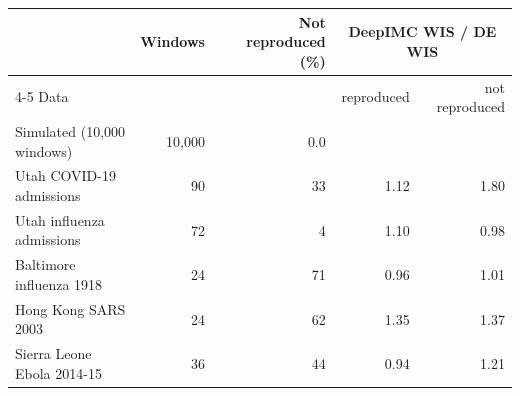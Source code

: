 \begin{tabular}{lrrrr}
\toprule
 & Windows & Not reproduced (\%) & \multicolumn{2}{c}{DeepIMC WIS / DE WIS} \\
\cmidrule(lr){4-5}
Data &  &  & reproduced & not reproduced \\
\midrule
Simulated (10,000 windows) & 10,000 & 0.0 &  &  \\
Utah COVID-19 admissions & 90 & 33 & 1.12 & 1.80 \\
Utah influenza admissions & 72 & 4 & 1.10 & 0.98 \\
Baltimore influenza 1918 & 24 & 71 & 0.96 & 1.01 \\
Hong Kong SARS 2003 & 24 & 62 & 1.35 & 1.37 \\
Sierra Leone Ebola 2014-15 & 36 & 44 & 0.94 & 1.21 \\
\bottomrule
\end{tabular}
